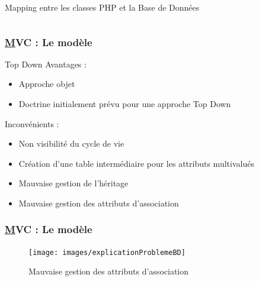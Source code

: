 \begin{frame}
\begin{block}{Mapping entre les classes PHP et la Base de Données}
\begin{columns}
	\end{columns}
	\end{block} 
\end{frame}




\speaker{\Julie}
\begin{frame}
	\frametitle{\underline{M}VC : Le modèle}
	\begin{block}{Top Down}
		Avantages :
		\begin{itemize}
			\item Approche objet
			\item Doctrine initialement prévu pour une approche Top Down
		\end{itemize}
 
		Inconvénients :
		\begin{itemize}
			\item Non visibilité du cycle de vie
			\item Création d'une table intermédiaire pour les attributs multivalués
			\item Mauvaise gestion de l'héritage
			\item Mauvaise gestion des attributs d'association
			
		\end{itemize}
	\end{block}
\end{frame}



\begin{frame}
	\frametitle{\underline{M}VC : Le modèle}
		\begin{figure}[!h]
			\begin{center}
				\texttt{[image: images/explicationProblemeBD]}
				\caption{Mauvaise gestion des attributs d'association}
			\end{center}
		\end{figure}
\end{frame}



